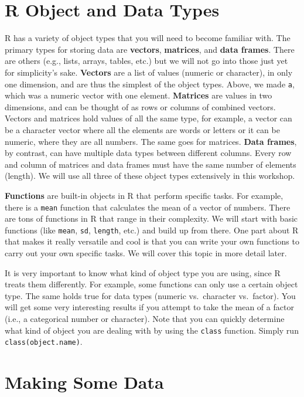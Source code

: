 \documentclass[]{book}
\theoremstyle{definition}
\theoremstyle{definition}
\theoremstyle{definition}
\theoremstyle{remark}
\begin{document}
\chapter{R Object and Data Types}\label{r-object-and-data-types}

R has a variety of object types that you will need to become familiar
with. The primary types for storing data are \textbf{vectors},
\textbf{matrices}, and \textbf{data frames}. There are others (e.g.,
lists, arrays, tables, etc.) but we will not go into those just yet for
simplicity's sake. \textbf{Vectors} are a list of values (numeric or
character), in only one dimension, and are thus the simplest of the
object types. Above, we made \texttt{a}, which was a numeric vector with
one element. \textbf{Matrices} are values in two dimensions, and can be
thought of as rows or columns of combined vectors. Vectors and matrices
hold values of all the same type, for example, a vector can be a
character vector where all the elements are words or letters or it can
be numeric, where they are all numbers. The same goes for matrices.
\textbf{Data frames}, by contrast, can have multiple data types between
different columns. Every row and column of matrices and data frames must
have the same number of elements (length). We will use all three of
these object types extensively in this workshop.

\textbf{Functions} are built-in objects in R that perform specific
tasks. For example, there is a \texttt{mean} function that calculates
the mean of a vector of numbers. There are tons of functions in R that
range in their complexity. We will start with basic functions (like
\texttt{mean}, \texttt{sd}, \texttt{length}, etc.) and build up from
there. One part about R that makes it really versatile and cool is that
you can write your own functions to carry out your own specific tasks.
We will cover this topic in more detail later.

It is very important to know what kind of object type you are using,
since R treats them differently. For example, some functions can only
use a certain object type. The same holds true for data types (numeric
vs.~character vs.~factor). You will get some very interesting results if
you attempt to take the mean of a factor (i.e., a categorical number or
character). Note that you can quickly determine what kind of object you
are dealing with by using the \texttt{class} function. Simply run
\texttt{class(object.name)}.

\chapter{Making Some Data}\label{making-some-data}
\end{document}
